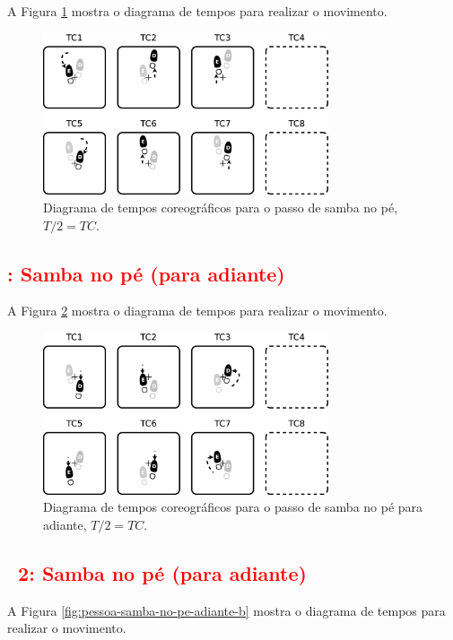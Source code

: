 A Figura \ref{fig:pessoa-samba-no-pe-b} mostra o diagrama de tempos para realizar o movimento.

\begin{figure}[h]
  \centering
    \includegraphics[width=0.75\textwidth]{chapters/cap-passos-footwork/samba-no-pe-b.eps}
\caption{Diagrama de tempos coreográficos para o passo de samba no pé, $T/2=TC$.}
\label{fig:pessoa-samba-no-pe-b}
\end{figure}

\subsection{\textcolor{red}{\Variante: Samba no pé (para adiante)}}
A Figura \ref{fig:pessoa-samba-no-pe-adiante} mostra o diagrama de tempos para realizar o movimento.

\begin{figure}[h]
  \centering
    \includegraphics[width=0.75\textwidth]{chapters/cap-passos-footwork/samba-no-pe-adiante.eps}
\caption{Diagrama de tempos coreográficos para o passo de samba no pé para adiante, $T/2=TC$.}
\label{fig:pessoa-samba-no-pe-adiante}
\end{figure}


\subsection{\textcolor{red}{\Variante~2: Samba no pé (para adiante)}}
A Figura \ref{fig:pessoa-samba-no-pe-adiante-b} mostra o diagrama de tempos para realizar o movimento.

